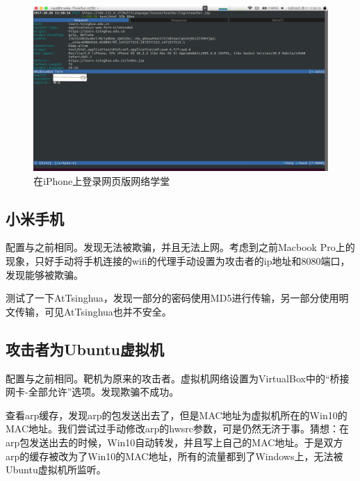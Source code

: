 \documentclass[a4paper]{article}
\begin{document}
\begin{figure}[htp]
\centering
\includegraphics[width=0.9\linewidth]{se_wlxt.jpg}
\caption{在iPhone上登录网页版网络学堂}
\label{fig:se_wlxt}
\end{figure}

\subsection{小米手机}
配置与之前相同。发现无法被欺骗，并且无法上网。考虑到之前Macbook Pro上的现象，只好手动将手机连接的wifi的代理手动设置为攻击者的ip地址和8080端口，发现能够被欺骗。

测试了一下AtTsinghua，发现一部分的密码使用MD5进行传输，另一部分使用明文传输，可见AtTsinghua也并不安全。

\subsection{攻击者为Ubuntu虚拟机}
配置与之前相同。靶机为原来的攻击者。虚拟机网络设置为VirtualBox中的“桥接网卡-全部允许”选项。发现欺骗不成功。

查看arp缓存，发现arp的包发送出去了，但是MAC地址为虚拟机所在的Win10的MAC地址。我们尝试过手动修改arp的hwsrc参数，可是仍然无济于事。猜想：在arp包发送出去的时候，Win10自动转发，并且写上自己的MAC地址。于是双方arp的缓存被改为了Win10的MAC地址，所有的流量都到了Windows上，无法被Ubuntu虚拟机所监听。
\end{document}

